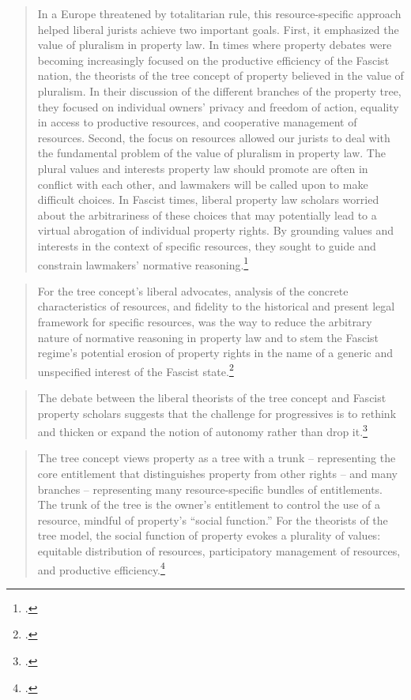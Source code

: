 \begin{quote}
In a Europe threatened by totalitarian
rule, this resource-specific approach helped liberal jurists achieve two
important goals. First, it emphasized the value of pluralism in property law. In
times where property debates were becoming increasingly
focused on the productive efficiency of the Fascist nation, the
theorists of the tree concept of property believed in the
value of pluralism. In their discussion of the different branches of the property tree,
they focused on individual owners' privacy and freedom of action, equality in access to productive resources, and cooperative management of resources. Second, the focus on resources allowed our jurists to deal with
the fundamental problem of the value of pluralism in property law. The plural values and interests property law should promote are often in conflict with each other, and lawmakers will be called upon to make
difficult choices. In Fascist times, liberal property law scholars worried about the arbitrariness of these choices that may potentially
lead to a virtual abrogation of individual property rights. By grounding values and interests in the context of specific resources, they sought to guide and constrain lawmakers' normative reasoning.\footcite[910-911]{robilant13}
\end{quote}

\begin{quote}
For the tree concept's liberal advocates, analysis of the concrete characteristics of resources,
and fidelity to the historical and present legal framework for specific resources,
was the way to reduce the arbitrary nature of normative reasoning in property law and to stem the Fascist regime's potential erosion of property rights in the name of a generic and
unspecified interest of the Fascist state.\footcite[911-912]{robilant13}
\end{quote}

\begin{quote}
The debate between the liberal theorists of the tree concept and Fascist property
scholars suggests that the challenge for progressives is to rethink and
thicken or expand the notion of autonomy rather than drop it.\footcite[928]{robilant13}
\end{quote}

\begin{quote}
The tree concept views property as a tree with a trunk -- representing
the core entitlement that distinguishes property from other rights -- and many branches -- representing
many resource-specific bundles of entitlements. The trunk of the tree is the owner's entitlement to control the use of a resource,
mindful of property's ``social function.'' For the theorists of the tree model, the social function of property evokes a plurality of values: equitable distribution of resources, participatory management of resources, and productive efficiency.\footnote{\cite[872]{robilant13}.}
\end{quote}

